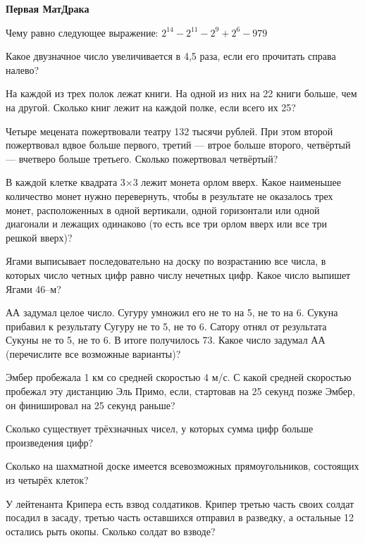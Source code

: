 \centerline{\bf \Huge Первая МатДрака }

 Чему равно следующее выражение:  $2^{14}-2^{11}-2^{9}+2^{6}-979$


 Какое двузначное число увеличивается в 4,5 раза, если его прочитать справа налево?


 На каждой из трех полок лежат книги. На одной из них на 22 книги больше, чем на другой. Сколько книг лежит на каждой полке, если всего их 25?


Четыре мецената пожертвовали театру 132 тысячи рублей. При этом второй пожертвовал вдвое больше первого, третий — втрое больше второго, четвёртый — вчетверо больше третьего. Сколько пожертвовал четвёртый?


 В каждой клетке квадрата 3×3 лежит монета орлом вверх. Какое наименьшее количество монет нужно перевернуть, чтобы в результате не оказалось трех монет, расположенных в одной вертикали, одной горизонтали или одной диагонали и лежащих одинаково (то есть все три орлом вверх или все три решкой вверх)?


Ягами выписывает последовательно на доску по возрастанию все числа, в которых число четных цифр равно числу нечетных цифр. Какое число выпишет Ягами 46–м?


 АА задумал целое число. Сугуру умножил его не то на 5, не то на 6. Сукуна прибавил к результату Сугуру не то 5, не то 6. Сатору отнял от результата Сукуны не то 5, не то 6. В итоге получилось 73. Какое число задумал АА (перечислите все возможные варианты)?

Эмбер пробежала 1 км со средней скоростью 4 м/с. С какой средней скоростью пробежал эту дистанцию Эль Примо, если, стартовав на 25 секунд позже Эмбер, он финишировал на 25 секунд раньше?


 Сколько существует трёхзначных чисел, у которых сумма цифр больше произведения цифр?


 Сколько на шахматной доске имеется всевозможных прямоугольников, состоящих из четырёх клеток?

 У лейтенанта Крипера есть взвод солдатиков. Крипер третью часть своих солдат посадил в засаду, третью часть оставшихся отправил в разведку, а остальные 12 остались рыть окопы. Сколько солдат во взводе?

\newpage
\hspace{6mm}

